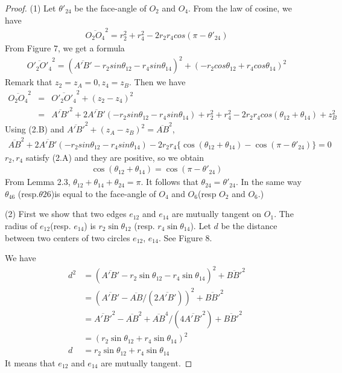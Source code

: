 \documentclass[dvipdfmx]{interact}
\theoremstyle{plain}%
\theoremstyle{definition}
\theoremstyle{remark}
\theoremstyle{problemstyle}
\begin{document}
\begin{proof}
 (1) Let $\theta'_{24}$ be the face-angle of $O_2$ and $O_4$. From the
 law of cosine, we have
 \begin{eqnarray}
  \overline{O_2O_4}^2 = r_2^2 + r_4^2 - 2r_2r_4cos(\pi-\theta'_{24})
 \end{eqnarray}
From Figure 7, we get a formula
\begin{eqnarray*}
 \overline{O'_2O'_4}^2 = (\overline{A'B'} - r_2sin\theta_{12}-
  r_4sin\theta_{14})^2 + (-r_2cos\theta_{12} + r_4 cos \theta_{14})^2
\end{eqnarray*}
 Remark that $z_2 = z_A= 0, z_4 = z_B$. Then we have
\begin{eqnarray*}
 \overline{O_2O_4}^2 &=& \overline{O'_2O'_4}^2 + (z_2-z_4)^2\\
 &=&\overline{A'B'}^2 + 2 \overline{A'B'}(-r_2sin\theta_{12} -
  r_4sin\theta_{14}) + r^2_2 + r^2_4 -2r_2r_4cos(\theta_{12} +
  \theta_{14}) + z^2_B
\end{eqnarray*}
Using (2.B) and $\overline{A'B'}^2 + (z_A-z_B)^2 = \overline{AB}^2$,
\begin{eqnarray*}
 \overline{AB}^2 + 2\overline{A'B'}(-r_2sin\theta_{12} -
  r_4sin\theta_{14}) - 2r_2r_4\{\cos(\theta_{12} + \theta_{14}) -
  \cos(\pi- \theta'_{24})\} = 0
\end{eqnarray*}
 $r_2, r_4$ satisfy (2.A) and they are positive, so we obtain
\begin{eqnarray*}
 \cos(\theta_{12} + \theta_{14}) = \cos(\pi - \theta'_{24})
\end{eqnarray*}
From Lemma 2.3, $\theta_{12} + \theta_{14} + \theta_{24} = \pi$. It
 follows that $\theta_24 = \theta'_24$. In the same way $\theta_{46}$
 (resp.$\theta{26}$)is equal to the face-angle of $O_4$ and $O_6$(resp
 $O_2$ and $O_6$.)

(2) First we show that two edges $e_{12}$ and $e_{14}$ are mutually tangent
 on $O_1$. The radius of $e_{12}$(resp. $e_{14}$) is
 $r_2\sin\theta_{12}$ (resp. $r_4\sin\theta_{14}$). Let $d$ be the
 distance between two centers of two circles $e_{12}$, $e_{14}$. See
 Figure 8.

We have
 \begin{align*}
d^2&= (\overline{A'B'} - r_2\sin\theta_{12}-r_4\sin\theta_{14})^2 + \overline{BB'}^2\\
&= (\overline{A'B'} - \overline{AB}/(2\overline{A'B'}))^2 + \overline{BB'}^2\\
&= \overline{A'B'}^2 - \overline{AB}^2 +\overline{AB}^4/(4\overline{A'B'}^2) + \overline{BB'}^2\\
&=(r_2\sin\theta_{12} + r_4\sin\theta_{14})^2\\
d&= r_2\sin\theta_12 + r_4\sin\theta_{14}
 \end{align*}
It means that $e_{12}$ and $e_{14}$ are mutually tangent.


\end{proof}
\end{document}
